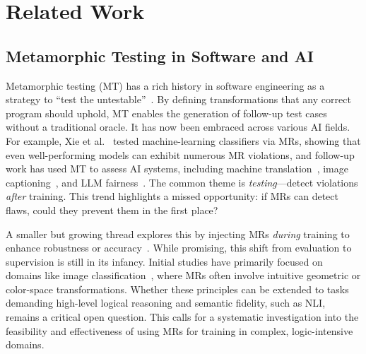 \documentclass[lettersize,journal]{IEEEtran}
\begin{document}




\section{Related Work}
\subsection{Metamorphic Testing in Software and AI}
Metamorphic testing (MT) has a rich history in software engineering as a strategy to ``test the untestable''~\cite{DBLP:journals/software/SeguraTZC20}. By defining transformations that any correct program should uphold, MT enables the generation of follow-up test cases without a traditional oracle. It has now been embraced across various AI fields. For example, Xie et al.~\cite{XIE2011544} tested machine-learning classifiers via MRs, showing that even well-performing models can exhibit numerous MR violations, and follow-up work has used MT to assess AI systems, including machine translation~\cite{DBLP:conf/icse/WangHWZHLHL23, DBLP:journals/tosem/XieJCC24}, image captioning~\cite{DBLP:journals/tse/XieLC24, DBLP:conf/kbse/YuanPW22}, and LLM fairness~\cite{DBLP:conf/qrs/Li0CXG24, 9700284, ribeiro-etal-2020-beyond}. The common theme is \emph{testing}---detect violations \emph{after} training. This trend highlights a missed opportunity: if MRs can detect flaws, could they prevent them in the first place?


A smaller but growing thread explores this by injecting MRs \emph{during} training to enhance robustness or accuracy~\cite{10.1145/3679006.3685067,DBLP:journals/corr/abs-2412-01958,DBLP:conf/icse/XuTFBZC18,DBLP:journals/corr/abs-2104-04718}. 
While promising, this shift from evaluation to supervision is still in its infancy. Initial studies have primarily focused on domains like image classification~\cite{10.1145/3679006.3685067,DBLP:journals/corr/abs-2412-01958,DBLP:conf/icse/XuTFBZC18,DBLP:journals/corr/abs-2104-04718}, where MRs often involve intuitive geometric or color-space transformations. Whether these principles can be extended to tasks demanding high-level logical reasoning and semantic fidelity, such as NLI, remains a critical open question. This calls for a systematic investigation into the feasibility and effectiveness of using MRs for training in complex, logic-intensive domains.
\end{document}
